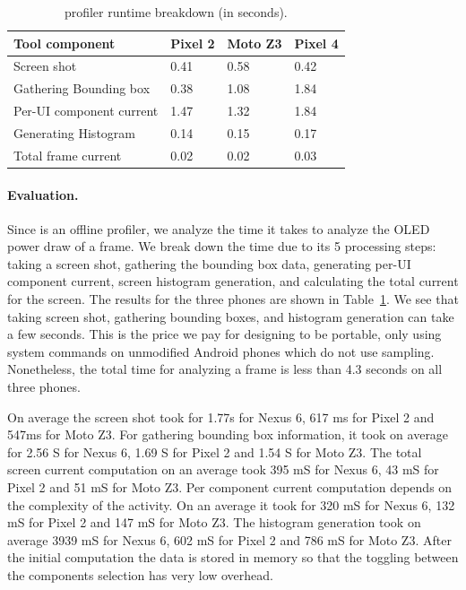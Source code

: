 \begin{table}[tp]
\begin{center}
	\centering
	\caption{\name profiler runtime breakdown (in seconds).}
	\label{tab:tooloverhead}
        \vspace{-0.1in}
    {\footnotesize
                \begin{tabular*}{\columnwidth}{ | p{} | p{} | p{} | p{} | }
		\hline
		Tool component        	&  Pixel 2 & Moto Z3 & Pixel 4\\
		\hline
		Screen shot	        	&  0.41 & 0.58 & 0.42 \\
		Gathering Bounding box  &  0.38 & 1.08 & 1.84 \\
		Per-UI component current	&  1.47 & 1.32 & 1.84 \\
		Generating Histogram	&  0.14 & 0.15 & 0.17 \\  
		Total frame current     &  0.02 & 0.02 & 0.03 \\
		\hline
	\end{tabular*}
	}
\end{center}
\vspace{-0.15in}
\end{table}

\paragraph{Evaluation.}
Since \name is an offline profiler,
we analyze the time it takes to analyze the OLED power draw of a frame.
We break down the time due
to its 5 processing steps: taking a screen shot, gathering the bounding box
data, generating per-UI component current, screen histogram generation,
and calculating the total current for the screen.  The results for the
three phones are shown in Table~\ref{tab:tooloverhead}.  We see that
taking screen shot, gathering bounding boxes, and histogram generation can
take a few seconds. This is the price we pay
for designing \name to be portable, \ie  only using system
commands on unmodified Android phones which do not use sampling.
Nonetheless, the total time for analyzing a frame is less than 4.3
seconds on all three phones.



On average the screen shot took for 1.77s for Nexus 6, 617
ms for Pixel 2 and 547ms for Moto Z3.  For gathering bounding box
information, it took on average for 2.56 S for Nexus 6, 1.69 S for
Pixel 2 and 1.54 S for Moto Z3.  The total screen current computation
on an average took 395 mS for Nexus 6, 43 mS for Pixel 2 and 51 mS for
Moto Z3.  Per component current computation depends on the complexity
of the activity. On an average it took for 320 mS for Nexus 6, 132 mS
for Pixel 2 and 147 mS for Moto Z3.  The histogram generation took on
average 3939 mS for Nexus 6, 602 mS for Pixel 2 and 786 mS for Moto
Z3.  After the initial computation the data is stored in memory so
that the toggling between the components selection has very low
overhead.
\fi

